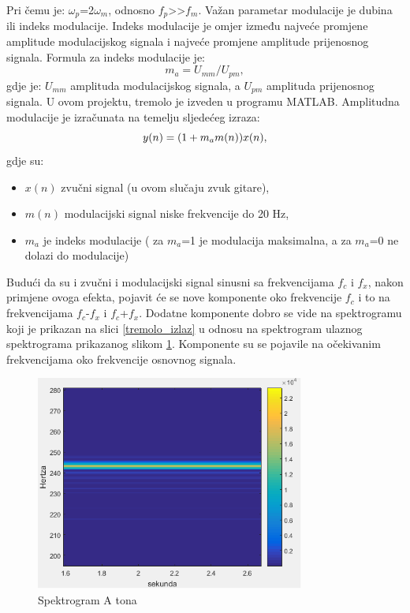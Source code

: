 \documentclass[conference]{IEEEtran}
\begin{document}
Pri čemu je: $\omega_{p}$=2$\omega_{m}$, odnosno $f_{p}$>>$f_{m}$.
Važan parametar modulacije je dubina ili indeks modulacije. Indeks modulacije je omjer između najveće promjene
amplitude modulacijskog signala i najveće promjene amplitude prijenosnog signala. Formula za indeks modulacije je:
\begin{equation}
  m_{a} = U_{mm}/U_{pm},
  \label{indeks_mod}
\end{equation}
gdje je: $U_{mm}$  amplituda modulacijskog signala, a $U_{pm}$ amplituda prijenosnog signala.
U ovom projektu, tremolo je izveden u programu MATLAB. Amplitudna modulacije je izračunata na temelju sljedećeg izraza:
\begin{equation}
  y(n) = (1+ m_{a}\*m(n))\*x(n),
  \label{matlab_mod}
\end{equation}
gdje su:
\begin{itemize}
  \item{$x(n)$ zvučni signal (u ovom slučaju zvuk gitare),}
  \item{$m(n)$ modulacijski signal niske frekvencije do 20 Hz,}
  \item{$m_{a}$ je indeks modulacije ( za $m_{a}$=1 je modulacija maksimalna, a za $m_{a}$=0 ne dolazi do modulacije)}
\end{itemize}

Budući da su i zvučni i modulacijski signal sinusni sa frekvencijama $f_{c}$ i $f_{x}$, nakon primjene ovoga efekta, pojavit
će se nove komponente oko frekvencije $f_{c}$ i to na frekvencijama $f_{c}$-$f_{x}$ i $f_{c}$+$f_{x}$. Dodatne komponente
dobro se vide na
spektrogramu koji je prikazan na slici \ref{tremolo_izlaz} u odnosu na spektrogram ulaznog spektrograma prikazanog
slikom \ref{tremolo_ulaz}. Komponente su se pojavile na očekivanim frekvencijama oko frekvencije osnovnog
signala.

\begin{figure}[H]
   \centerline{\includegraphics[height=200pt]{slike/tremolo_spektar_ulaz.png}}
   \caption{Spektrogram A tona}
   \label{tremolo_ulaz}
 \end{figure}
\end{document}

